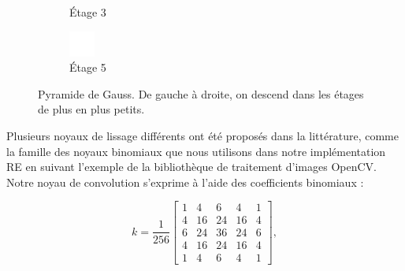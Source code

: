 \begin{figure}[h]
\begin{subfigure}{.3\textwidth}
        \caption{Étage 3}
    \end{subfigure}
    \hfill
    \begin{subfigure}{.3\textwidth}
        \centering
        \includegraphics[width=\textwidth]{contenu/resources/images/gauss_5}
        \caption{Étage 5}
    \end{subfigure}

    \caption[Pyramide de Gauss]{Pyramide de Gauss. De gauche à droite, on descend dans les étages de plus en plus petits.}
    \label{fig:gaussian-pyramid}
\end{figure}

Plusieurs noyaux de lissage différents ont été proposés dans la littérature, comme la famille des noyaux binomiaux que nous utilisons dans notre implémentation RE en suivant l'exemple de la bibliothèque de traitement d'images OpenCV. Notre noyau de convolution s'exprime à l'aide des coefficients binomiaux :

\begin{equation}
    k = \frac{1}{256}\left[
        \begin{array}{ccccccc}
            1 & 4 & 6 & 4 & 1 \\
            4 & 16 & 24 & 16 & 4 \\
            6 & 24 & 36 & 24 & 6 \\
            4 & 16 & 24 & 16 & 4 \\
            1 & 4 & 6 & 4 & 1
        \end{array}
    \right],
\end{equation}

